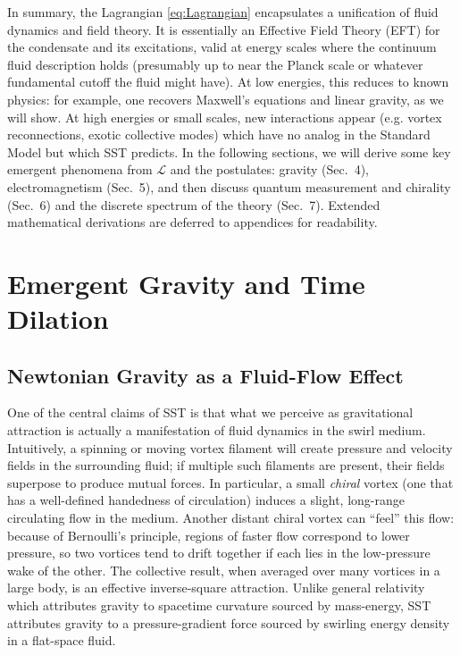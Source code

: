 \documentclass[10pt,reprint,aps,onecolumn,nofootinbib]{revtex4-2}
\begin{document}
In summary, the Lagrangian \eqref{eq:Lagrangian} encapsulates a unification of fluid dynamics and field theory. It is essentially an Effective Field Theory (EFT) for the condensate and its excitations, valid at energy scales where the continuum fluid description holds (presumably up to near the Planck scale or whatever fundamental cutoff the fluid might have). At low energies, this reduces to known physics: for example, one recovers Maxwell’s equations and linear gravity, as we will show. At high energies or small scales, new interactions appear (e.g. vortex reconnections, exotic collective modes) which have no analog in the Standard Model but which SST predicts. In the following sections, we will derive some key emergent phenomena from $\mathcal{L}$ and the postulates: gravity (Sec.~4), electromagnetism (Sec.~5), and then discuss quantum measurement and chirality (Sec.~6) and the discrete spectrum of the theory (Sec.~7). Extended mathematical derivations are deferred to appendices for readability.


\section{Emergent Gravity and Time Dilation}

\subsection{Newtonian Gravity as a Fluid-Flow Effect}

One of the central claims of SST is that what we perceive as gravitational attraction is actually a manifestation of fluid dynamics in the swirl medium. Intuitively, a spinning or moving vortex filament will create pressure and velocity fields in the surrounding fluid; if multiple such filaments are present, their fields superpose to produce mutual forces. In particular, a small \emph{chiral} vortex (one that has a well-defined handedness of circulation) induces a slight, long-range circulating flow in the medium. Another distant chiral vortex can ``feel'' this flow: because of Bernoulli’s principle, regions of faster flow correspond to lower pressure, so two vortices tend to drift together if each lies in the low-pressure wake of the other. The collective result, when averaged over many vortices in a large body, is an effective inverse-square attraction. Unlike general relativity which attributes gravity to spacetime curvature sourced by mass-energy, SST attributes gravity to a pressure-gradient force sourced by swirling energy density in a flat-space fluid.
\end{document}
